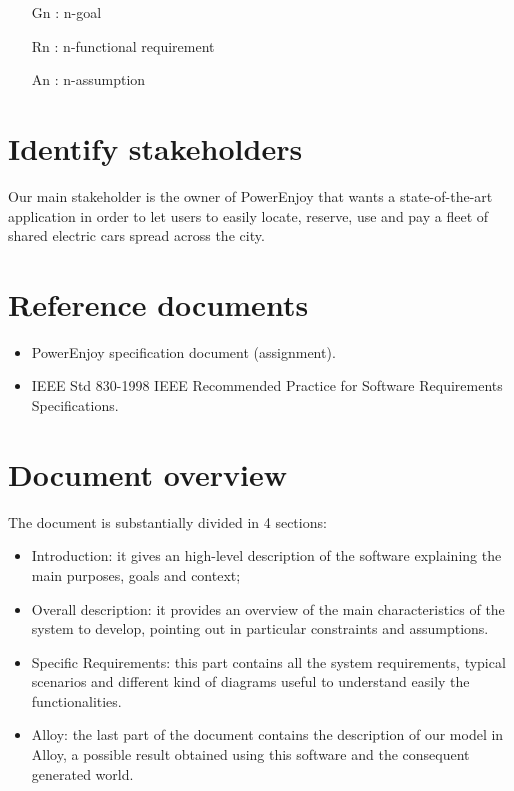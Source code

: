 \begin{itemize}
\item [Gn]: n-goal
\item [Rn]: n-functional requirement
\item [An]: n-assumption
\end{itemize}

\section{Identify stakeholders}

Our main stakeholder is the owner of PowerEnjoy that wants a state-of-the-art application in order to let users to easily locate, reserve, use and pay a fleet of shared electric cars spread across the city.

\section{Reference documents}

\begin{itemize}
\item PowerEnjoy specification document (assignment).
\item IEEE Std 830-1998 IEEE Recommended Practice for Software Requirements Specifications.
\end{itemize}
\section{Document overview}
The document is substantially divided in 4 sections:
\begin{itemize}
\item Introduction: it gives an high-level description of the software explaining the main purposes, goals and context;
\item Overall description: it provides an overview of the main characteristics of the system to develop, pointing out in particular constraints and assumptions.
\item Specific Requirements: this part contains all the system requirements, typical scenarios and different kind of diagrams useful to understand easily the functionalities.
\item Alloy: the last part of the document contains the description of our model in Alloy, a possible result obtained using this software and the consequent generated world.
\end{itemize}
